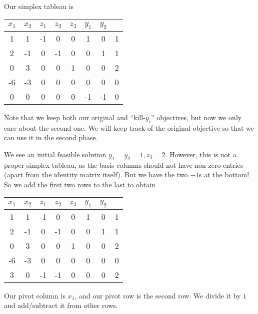 \documentclass[a4paper]{article}
\begin{document}
\begin{eg}
  Our simplex tableau is
  \begin{center}
    \begin{tabular}{cccccccc}
      \toprule
      $x_1$ & $x_2$ & $z_1$ & $z_2$ & $z_3$ & $y_1$ & $y_2$ \\
      \midrule
      1 & 1 & -1 & 0 & 0 & 1 & 0 & 1\\
      2 & -1 & 0 & -1 & 0 & 0 & 1 & 1\\
      0 & 3 & 0 & 0 & 1 & 0 & 0 & 2\\
      \midrule
      -6 & -3 & 0 & 0 & 0 & 0 & 0 & 0\\
      0 & 0 & 0 & 0 & 0 & -1 & -1 & 0\\
      \bottomrule
    \end{tabular}
  \end{center}
  Note that we keep both our original and ``kill-$y_i$'' objectives, but now we only care about the second one. We will keep track of the original objective so that we can use it in the second phase.

  We see an initial feasible solution $y_1 = y_2 = 1, z_3 = 2$. However, this is not a proper simplex tableau, as the basis columns should not have non-zero entries (apart from the identity matrix itself). But we have the two $-1$s at the bottom! So we add the first two rows to the last to obtain
  \begin{center}
    \begin{tabular}{cccccccc}
      \toprule
      $x_1$ & $x_2$ & $z_1$ & $z_2$ & $z_3$ & $y_1$ & $y_2$ \\
      \midrule
      1 & 1 & -1 & 0 & 0 & 1 & 0 & 1\\
      2 & -1 & 0 & -1 & 0 & 0 & 1 & 1\\
      0 & 3 & 0 & 0 & 1 & 0 & 0 & 2\\
      \midrule
      -6 & -3 & 0 & 0 & 0 & 0 & 0 & 0\\
      3 & 0 & -1 & -1 & 0 & 0 & 0 & 2\\
      \bottomrule
    \end{tabular}
  \end{center}
  Our pivot column is $x_1$, and our pivot row is the second row. We divide it by $1 $ and add/subtract it from other rows.


\end{eg}
\end{document}
